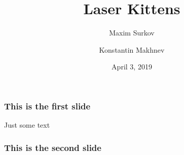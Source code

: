 \documentclass[12pt]{beamer}
\title[kittens] {Laser Kittens}
\author[Maxim Surkov, Konstantin Makhnev]
{Maxim Surkov \and Konstantin Makhnev}
\institute[Abstract University]
{
  Higher School of Economics
}
\date[date]
{April 3, 2019}
\begin{document}
\frame{\titlepage}

\begin{frame}
    \frametitle{This is the first slide}
    Just some text
\end{frame}

\begin{frame}
    \frametitle{This is the second slide}
\end{frame}
\end{document}
